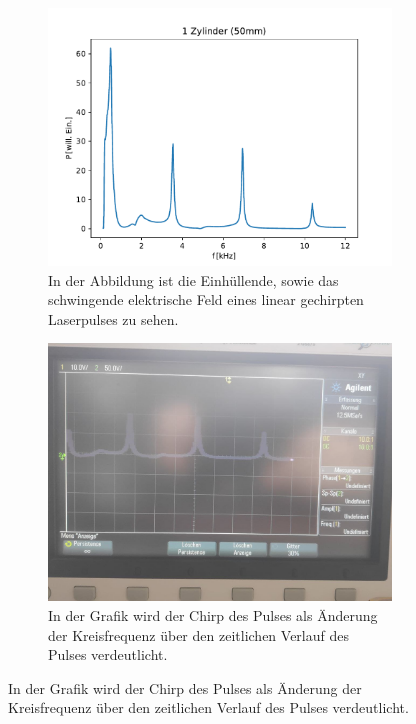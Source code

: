         \begin{figure}
            \centering
            \begin{subfigure}[b]{0.45\textwidth}
                \centering
                \includegraphics[scale=0.4]{./pictures/1_Zylinder_50mm.pdf}
                \caption{In der Abbildung ist die Einhüllende, sowie das schwingende elektrische Feld eines linear gechirpten Laserpulses zu sehen.}
                \label{fig:e_feld_chirp}
            \end{subfigure}
            \hfill
            \centering
            \begin{subfigure}[b]{0.45\textwidth}
                \centering
                \includegraphics[scale=0.13]{./pictures/1_Zylinder.jpg}
                \caption{In der Grafik wird der Chirp des Pulses als Änderung der Kreisfrequenz über den zeitlichen Verlauf des Pulses verdeutlicht.}
                \label{fig:chirp}
            \end{subfigure}


\end{figure}
